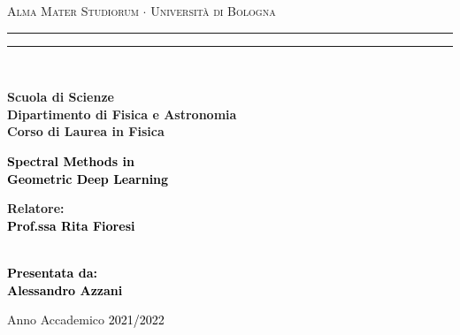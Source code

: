 \documentclass[12pt,a4paper]{report}
\theoremstyle{definition}
\begin{document}
\begin{titlepage}
%
%
%
%
\begin{center}
{{\Large{\textsc{Alma Mater Studiorum $\cdot$ Universit\`a di Bologna}}}} 
\rule[0.1cm]{15.8cm}{0.1mm}
\rule[0.5cm]{15.8cm}{0.6mm}
\\\vspace{3mm}

{\small{\bf Scuola di Scienze \\ 
Dipartimento di Fisica e Astronomia\\
Corso di Laurea in Fisica}}

\end{center}

\vspace{23mm}

\begin{center}\textcolor{black}{
%
%
{\LARGE{\bf Spectral Methods in \vspace{2mm}\\
Geometric Deep Learning}}\\
}\end{center}

\vspace{50mm} \par \noindent

\begin{minipage}[t]{0.47\textwidth}
%
%
{\large{\bf Relatore: \vspace{2mm}\\\textcolor{black}{
Prof.ssa Rita Fioresi}\\\\}}
%
%
%
\end{minipage}
%
\hfill
%
\begin{minipage}[t]{0.47\textwidth}\raggedleft \textcolor{black}{
{\large{\bf Presentata da:
\vspace{2mm}\\
%
%
Alessandro Azzani}}}
\end{minipage}

\vspace{40mm}

\begin{center}
%
%
Anno Accademico \textcolor{black}{ 2021/2022}
\end{center}

\end{titlepage}
\end{document}
